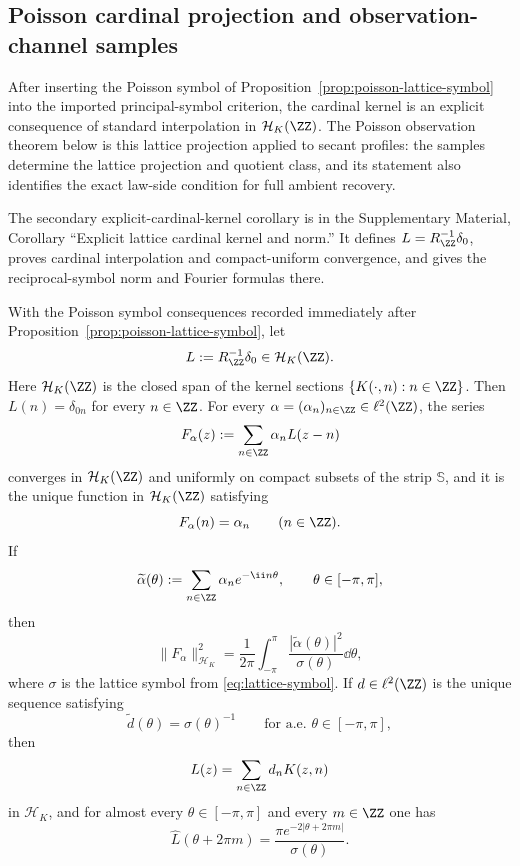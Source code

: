 
\subsection{Poisson cardinal projection and observation-channel samples}%
\label{subsec:poisson-cardinal-observation}

After inserting the Poisson symbol of
Proposition~\ref{prop:poisson-lattice-symbol} into the imported
principal-symbol criterion, the cardinal kernel is an explicit consequence of
standard interpolation in $\mathcal H_K(\ZZ)$.  The Poisson observation theorem
below is this lattice projection applied to secant profiles: the samples
determine the lattice projection and quotient class, and its statement also
identifies the exact law-side condition for full ambient recovery.

\ifdefined\JFAArticleMain
The secondary explicit-cardinal-kernel corollary is in the Supplementary
Material, Corollary ``Explicit lattice cardinal kernel and norm.''  It defines
\(L=R_{\ZZ}^{-1}\delta_0\), proves cardinal interpolation and compact-uniform
convergence, and gives the reciprocal-symbol norm and Fourier formulas there.
\else
\begin{corollary}%
\label{cor:poisson-cardinal-reconstruction}
With the Poisson symbol consequences recorded immediately after
Proposition~\ref{prop:poisson-lattice-symbol}, let
\[
L:=R_{\ZZ}^{-1}\delta_0\in\mathcal H_K(\ZZ).
\]
Here $\mathcal H_K(\ZZ)$ is the closed span of the kernel sections
$\{K(\cdot,n):n\in\ZZ\}$.
Then $L(n)=\delta_{0n}$ for every $n\in\ZZ$.  For every
$\alpha=(\alpha_n)_{n\in\ZZ}\in\ell^2(\ZZ)$, the series
\[
F_\alpha(z):=\sum_{n\in\ZZ}\alpha_nL(z-n)
\]
converges in $\mathcal H_K(\ZZ)$ and uniformly on compact subsets of the
strip $\mathbb S$, and it is the unique function in $\mathcal H_K(\ZZ)$
satisfying
\[
F_\alpha(n)=\alpha_n
\qquad(n\in\ZZ).
\]
If
\[
\widetilde\alpha(\theta):=\sum_{n\in\ZZ}\alpha_ne^{-\ii n\theta},
\qquad \theta\in[-\pi,\pi],
\]
then
\begin{equation}\label{eq:cardinal-norm-formula}
\|F_\alpha\|_{\mathcal H_K}^2
=\frac{1}{2\pi}\int_{-\pi}^{\pi}
\frac{|\widetilde\alpha(\theta)|^2}{\sigma(\theta)}\dd\theta,
\end{equation}
where $\sigma$ is the lattice symbol from \eqref{eq:lattice-symbol}.  If
$d\in\ell^2(\ZZ)$ is the unique sequence satisfying
\[
\widetilde d(\theta)=\sigma(\theta)^{-1}
\qquad\text{for a.e. }\theta\in[-\pi,\pi],
\]
then
\[
L(z)=\sum_{n\in\ZZ}d_nK(z,n)
\]
in $\mathcal H_K$, and for almost every $\theta\in[-\pi,\pi]$ and every
$m\in\ZZ$ one has
\begin{equation}\label{eq:cardinal-kernel-fourier}
\widehat L(\theta+2\pi m)
=\frac{\pi e^{-2|\theta+2\pi m|}}{\sigma(\theta)}.
\end{equation}
\end{corollary}

